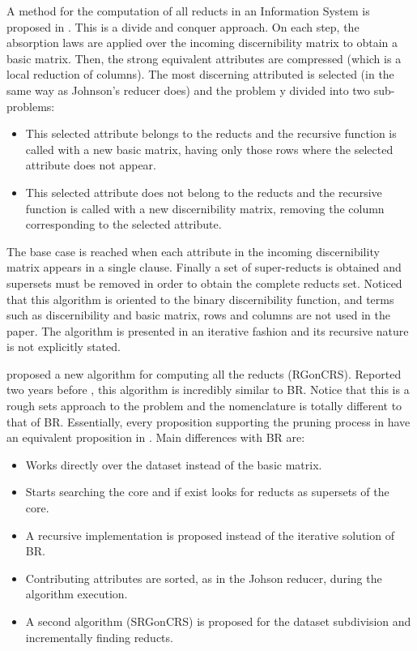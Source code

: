 \documentclass[authoryear,11pt]{elsarticle}
\begin{document}
  A method for the computation of all reducts in an Information System is proposed in \citep{Starzyk99,Starzyk00}.
  This is a divide and conquer approach. On each step, the absorption laws are applied over the incoming
  discernibility matrix to obtain a basic matrix. Then, the strong equivalent attributes are compressed
  (which is a local reduction of columns). The most discerning attributed is selected (in the same way as 
  Johnson's reducer does) and the problem y divided into two sub-problems: 
  \begin{itemize}
  \item This selected attribute belongs to the reducts and the recursive function is called with a new basic 
  matrix, having only those rows where the selected attribute does not appear.
  \item This selected attribute does not belong to the reducts and the recursive function is called with a new 
  discernibility matrix, removing the column corresponding to the selected attribute.
  \end{itemize}
  The base case is reached when each attribute in the incoming discernibility matrix appears in a single
  clause. Finally a set of super-reducts is obtained and supersets must be removed in order to obtain 
  the complete reducts set.
  Noticed that this algorithm is oriented to the binary discernibility function, and 
  terms such as discernibility and basic matrix, rows and columns are not used in the paper. The
  algorithm is presented in an iterative fashion and its recursive nature is not explicitly stated.
  
  \cite{WangP07} proposed a new algorithm for computing all the reducts (RGonCRS). Reported two years before
  \citep{Lias09}, this algorithm is incredibly similar to BR. Notice that this is a rough sets approach to the
  problem and the nomenclature is totally different to that of BR. Essentially, every proposition supporting the
  pruning process in \citep{WangP07} have an equivalent proposition in \citep{Lias09}. Main differences with BR
  are:
  \begin{itemize}
  \item Works directly over the dataset instead of the basic matrix.
  \item Starts searching the core and if exist looks for reducts as supersets of the core.
  \item A recursive implementation is proposed instead of the iterative solution of BR.
  \item Contributing attributes are sorted, as in the Johson reducer, during the algorithm execution.
  \item A second algorithm (SRGonCRS) is proposed for the dataset subdivision and incrementally 
  		finding reducts.
  \end{itemize}
  
\end{document}
